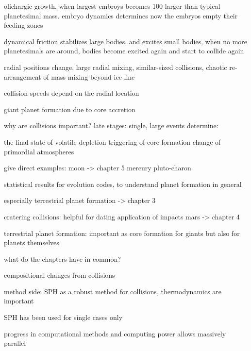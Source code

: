 olichargic growth, when largest embroys becomes 100 larger than typical planetesimal mass. embryo dynamics determines now the \cite{1993Icar..106..210I} \cite{2010ApJ...714L.103O}
embryos empty their feeding zones


dynamical friction stabilizes large bodies, and excites small bodies, when no more planetesimals are around, bodies become excited again and start to collide again

radial positions change, large radial mixing, similar-sized collisions, chaotic re-arrangement of mass mixing beyond ice line  \cite{Chambers:2004p4098} \cite{Chambers:2001p2105}

collision speeds depend on the radial location

giant planet formation due to core accretion \citep{1996Icar..124...62P} 

why are collisions important?
late stages: single, large events determine:

the final state of volatile depletion \citep{2001E&PSL.192..545H}
triggering of core formation \cite{1992Icar..100..326T}
change of primordial atmospheres \cite{2002DPS....34.2804A}

give direct examples:
moon -> chapter 5 \cite{Canup:2001p1861} \cite{1987Icar...71...30B} \cite{1975Icar...24..504H} \cite{1976LPI.....7..120C}
mercury \cite{Benz:1988p3336}
pluto-charon \cite{Canup:2005p1987}

statistical results for evolution codes, to understand planet formation in general 

especially terrestrial planet formation \cite{2006Icar..184...39O} 
\cite{Lisse:2009p3131} -> chapter 3

cratering collisions: helpful for dating 
application of impacts mars -> chapter 4


\cite{Chambers:2004p4098}

terrestrial planet formation: important as core formation for giants but also for planets themselves


what do the chapters have in common?

compositional changes from collisions

method side: SPH as a robust method for collisions, thermodynamics are important

SPH has been used for single cases only

progress in computational methods and computing power allows massively parallel 



